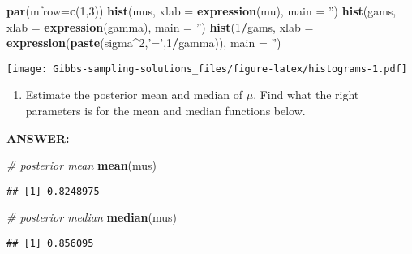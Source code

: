 \documentclass[
]{article}
\newenvironment{Shaded}{\begin{snugshade}}{\end{snugshade}}
\newcommand{\CommentTok}[1]{\textcolor[rgb]{0.56,0.35,0.01}{\textit{#1}}}
\newcommand{\DataTypeTok}[1]{\textcolor[rgb]{0.13,0.29,0.53}{#1}}
\newcommand{\DecValTok}[1]{\textcolor[rgb]{0.00,0.00,0.81}{#1}}
\newcommand{\KeywordTok}[1]{\textcolor[rgb]{0.13,0.29,0.53}{\textbf{#1}}}
\newcommand{\NormalTok}[1]{#1}
\newcommand{\OperatorTok}[1]{\textcolor[rgb]{0.81,0.36,0.00}{\textbf{#1}}}
\newcommand{\StringTok}[1]{\textcolor[rgb]{0.31,0.60,0.02}{#1}}
\providecommand{\tightlist}{%
  \setlength{\itemsep}{0pt}\setlength{\parskip}{0pt}}
\begin{document}
\begin{Shaded}
\begin{Highlighting}[]
\KeywordTok{par}\NormalTok{(}\DataTypeTok{mfrow=}\KeywordTok{c}\NormalTok{(}\DecValTok{1}\NormalTok{,}\DecValTok{3}\NormalTok{))}
\KeywordTok{hist}\NormalTok{(mus, }\DataTypeTok{xlab =} \KeywordTok{expression}\NormalTok{(mu), }\DataTypeTok{main =} \StringTok{''}\NormalTok{)}
\KeywordTok{hist}\NormalTok{(gams, }\DataTypeTok{xlab =} \KeywordTok{expression}\NormalTok{(gamma), }\DataTypeTok{main =} \StringTok{''}\NormalTok{)}
\KeywordTok{hist}\NormalTok{(}\DecValTok{1}\OperatorTok{/}\NormalTok{gams, }\DataTypeTok{xlab =} \KeywordTok{expression}\NormalTok{(}\KeywordTok{paste}\NormalTok{(sigma}\OperatorTok{^}\DecValTok{2}\NormalTok{,}\StringTok{'='}\NormalTok{,}\DecValTok{1}\OperatorTok{/}\NormalTok{gamma)), }\DataTypeTok{main =} \StringTok{''}\NormalTok{)}
\end{Highlighting}
\end{Shaded}

\texttt{[image: Gibbs-sampling-solutions\_files/figure-latex/histograms-1.pdf]}

\begin{enumerate}
\def\labelenumi{\arabic{enumi}.}
\setcounter{enumi}{5}
\tightlist
\item
  Estimate the posterior mean and median of \(\mu\). Find what the right
  parameters is for the mean and median functions below.
\end{enumerate}

\textbf{ANSWER:}

\begin{Shaded}
\begin{Highlighting}[]
\CommentTok{# posterior mean}
\KeywordTok{mean}\NormalTok{(mus)}
\end{Highlighting}
\end{Shaded}

\begin{verbatim}
## [1] 0.8248975
\end{verbatim}

\begin{Shaded}
\begin{Highlighting}[]
\CommentTok{# posterior median}
\KeywordTok{median}\NormalTok{(mus)}
\end{Highlighting}
\end{Shaded}

\begin{verbatim}
## [1] 0.856095
\end{verbatim}
\end{document}
